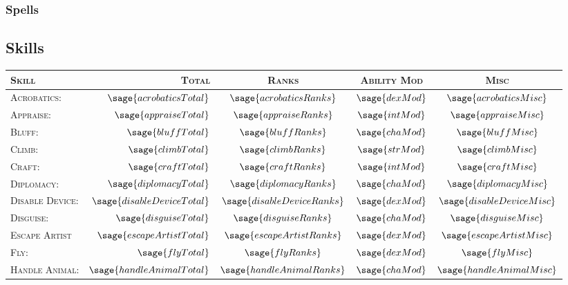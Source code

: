 \documentclass[10pt]{article}
\begin{document}
	\subsubsection*{Spells}
		\spells

%
%

\subsection*{Skills} 

	\begin{tabular}{l r c c c}
		\textsc{Skill} & \textsc{Total} & \textsc{Ranks} & \textsc{Ability Mod} & \textsc{Misc} \\
		\hline
		\textsc{Acrobatics:} & \(\sage{acrobaticsTotal}\) & \(\sage{acrobaticsRanks}\) & \(\sage{dexMod}\) & \(\sage{acrobaticsMisc}\) \\
		\textsc{Appraise:} & \(\sage{appraiseTotal}\) & \(\sage{appraiseRanks}\) & \(\sage{intMod}\) & \(\sage{appraiseMisc}\) \\
		\textsc{Bluff:} & \(\sage{bluffTotal}\) & \(\sage{bluffRanks}\) & \(\sage{chaMod}\) & \(\sage{bluffMisc}\) \\
		\textsc{Climb:} & \(\sage{climbTotal}\) & \(\sage{climbRanks}\) & \(\sage{strMod}\) & \(\sage{climbMisc}\) \\
		\textsc{Craft:} & \(\sage{craftTotal}\) & \(\sage{craftRanks}\) & \(\sage{intMod}\) & \(\sage{craftMisc}\) \\
		\textsc{Diplomacy:} & \(\sage{diplomacyTotal}\) & \(\sage{diplomacyRanks}\) & \(\sage{chaMod}\) & \(\sage{diplomacyMisc}\) \\
		\textsc{Disable Device:} & \(\sage{disableDeviceTotal}\) & \(\sage{disableDeviceRanks}\) & \(\sage{dexMod}\) & \(\sage{disableDeviceMisc}\) \\
		\textsc{Disguise:} & \(\sage{disguiseTotal}\) & \(\sage{disguiseRanks}\) & \(\sage{chaMod}\) & \(\sage{disguiseMisc}\) \\
		\textsc{Escape Artist} & \(\sage{escapeArtistTotal}\) & \(\sage{escapeArtistRanks}\) & \(\sage{dexMod}\) & \(\sage{escapeArtistMisc}\) \\
		\textsc{Fly:} & \(\sage{flyTotal}\) & \(\sage{flyRanks}\) & \(\sage{dexMod}\) & \(\sage{flyMisc}\) \\
		\textsc{Handle Animal:} & \(\sage{handleAnimalTotal}\) & \(\sage{handleAnimalRanks}\) & \(\sage{chaMod}\) & \(\sage{handleAnimalMisc}\) \\

\end{tabular}
\end{document}
